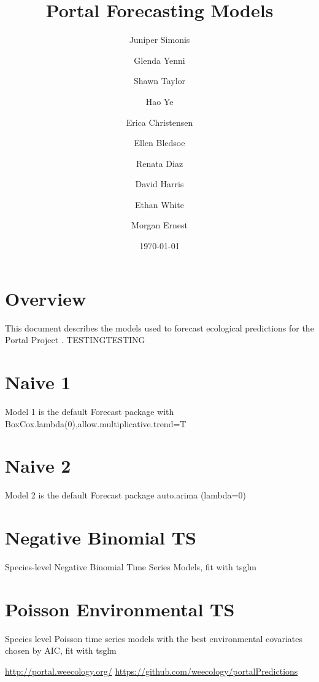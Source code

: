 \documentclass{article}
\title{Portal Forecasting Models}
\author[1]{Juniper Simonis}
\author[1]{Glenda Yenni}
\author[1]{Shawn Taylor}
\author[1]{Hao Ye}
\author[1]{Erica Christensen}
\author[1]{Ellen Bledsoe}
\author[1]{Renata Diaz}
\author[1]{David Harris}
\author[1]{Ethan White}
\author[1]{Morgan Ernest}
\affil[1]{Weecology Laboratory, University of Florida}
\date{\today}
\begin{document}
\maketitle
\tableofcontents

\section*{Overview}
\label{sec:overview}

This document describes the models used to forecast ecological predictions for the Portal Project \cite{portal, portalpredictions}. 
TESTINGTESTING

\section{Naive 1}
\label{sec:naive01}

Model 1 is the default Forecast package with BoxCox.lambda(0),allow.multiplicative.trend=T

\section{Naive 2}
\label{sec:naive02}

Model 2 is the default Forecast package auto.arima (lambda=0)

\section{Negative Binomial TS}
\label{sec:neg_binom_ts}

Species-level Negative Binomial Time Series Models, fit with tsglm

\section{Poisson Environmental TS}
\label{sec:pois_env_ts}

Species level Poisson time series models with the best environmental covariates chosen by AIC, fit with tsglm

\begin{thebibliography}{9}
  \url{http://portal.weecology.org/}
  \url{https://github.com/weecology/portalPredictions}

\end{thebibliography}
\end{document}
